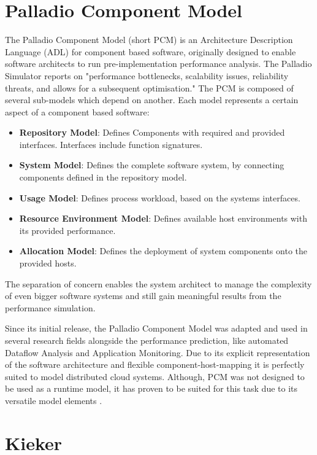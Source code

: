 \section{Palladio Component Model}
\label{sec:Foundations:pcm}

The Palladio Component Model (short PCM) is an Architecture Description Language (ADL) for component based software, originally designed to enable software architects to run pre-implementation performance analysis. The Palladio Simulator reports on "performance bottlenecks, scalability issues, reliability threats, and allows for a subsequent optimisation." The PCM is composed of several sub-models which depend on another. Each model represents a certain aspect of a component based software:

\begin{itemize}
	\setlength\itemsep{0em}
	\item \textbf{Repository Model}: Defines Components with required and provided interfaces. Interfaces include function signatures. 
	\item \textbf{System Model}: Defines the complete software system, by connecting components defined in the repository model.
	\item \textbf{Usage Model}: Defines process workload, based on the systems interfaces.
	\item \textbf{Resource Environment Model}: Defines available host environments with its provided performance.
	\item \textbf{Allocation Model}: Defines the deployment of system components onto the provided hosts.
\end{itemize}

The separation of concern enables the system architect to manage the complexity of even bigger software systems and still gain meaningful results from the performance simulation.

Since its initial release, the Palladio Component Model was adapted and used in several research fields alongside the performance prediction, like automated Dataflow Analysis and Application Monitoring. Due to its explicit representation of the software architecture and flexible component-host-mapping it is perfectly suited to model distributed cloud systems. Although, PCM was not designed to be used as a runtime model, it has proven to be suited for this task due to its versatile model elements \cite{Becker.2009}.

\section{Kieker}
\label{sec:Foundations:Kieker}


